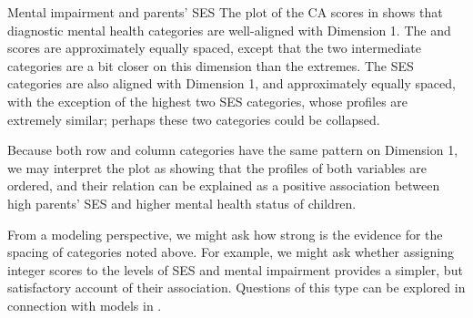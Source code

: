 \documentclass[11pt]{book}\usepackage[]{graphicx}\usepackage[]{color}
\begin{document}
\begin{Example}[mental3]{Mental impairment and parents' SES}
The plot of the CA scores in  shows that
diagnostic mental health categories are well-aligned with Dimension 1.  The
and scores are approximately equally spaced, except that
the two intermediate categories are a bit closer on this dimension than
the extremes.  The
SES categories are also aligned with Dimension 1, and approximately
equally spaced, with the exception of the highest two SES categories,
whose profiles are extremely similar;
perhaps these two categories could be collapsed.

Because both row and column categories have the same pattern on
Dimension 1, we may interpret the plot as showing that the profiles
of both variables are ordered, and their relation can be explained
as a positive association between high parents' SES and higher mental
health status of children. 

From a modeling perspective,  we might ask how strong is the evidence
for the spacing of categories noted above.  For example, we might
ask whether assigning integer scores to the levels of SES and mental
impairment provides a simpler, but satisfactory account of their association.
Questions of this type can be explored in connection with \loglin models in
. 

\end{Example}
\end{document}
